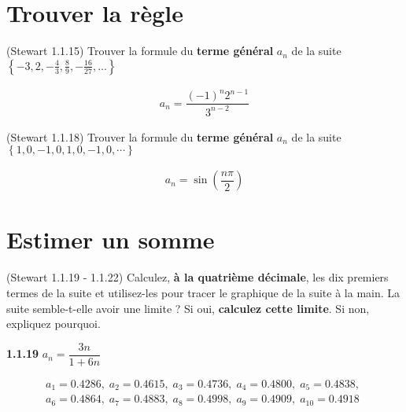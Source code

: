 \documentclass{report}
\begin{document}
    \section{Trouver la règle}
    \begin{Exercice}{(Stewart 1.1.15)}{}
       Trouver la formule du \textbf{terme général} $a_n$ de la suite    
       $\left\{-3, 2,-\frac43, \frac89, -\frac{16}{27},\ldots\right\}$ 
    \end{Exercice}              


    \begin{align*}
        a_n = \dfrac{(-1)^n 2^{n-1}}{3^{n - 2}}
    \end{align*}            


    \begin{Exercice}{(Stewart 1.1.18)}{}
    Trouver la formule du \textbf{terme général} $a_n$ de la suite    
    $\left\{1,0,-1,0,1,0,-1,0,\cdots \right\}$
    \end{Exercice}

    \begin{align*}
        a_n = \sin\left(\dfrac{n\pi}{2}\right)
    \end{align*}        

    \section{Estimer un somme}


    \begin{Exercice}{(Stewart 1.1.19 - 1.1.22)}{}
        Calculez, \textbf{à la quatrième décimale}, 
        les dix premiers termes de la suite et 
        utilisez-les pour tracer le graphique de la suite à la main. 
        La suite semble-t-elle avoir une limite ? 
        Si oui, \textbf{calculez cette limite}. 
        Si non, expliquez pourquoi.
    \end{Exercice}

    \vspace{1em}%
    \noindent\textbf{1.1.19}  $a_n = \dfrac{3n}{1 + 6n}$ 


    \begin{align*}
        a_1 = 0.4286, \; a_2 = 0.4615, \; 
        a_3 = 0.4736, \; a_4 = 0.4800, \; 
        a_5 = 0.4838, \;
        \\
        a_6 = 0.4864, \; a_7 = 0.4883, \; 
        a_8 = 0.4998, \; a_9 =0.4909, \; 
        a_{10} = 0.4918
    \end{align*}    
\end{document}
